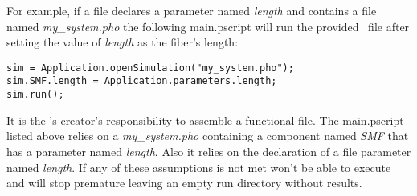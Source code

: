 For example, if a \PJOB{} file declares a parameter named \textit{length}
and contains a file named \textit{my\_system.pho}
the following main.pscript will run the provided \pho\ file
after setting the value of \textit{length} as the fiber's length:

\lstset{language=JavaScript}
\begin{lstlisting}
sim = Application.openSimulation("my_system.pho");
sim.SMF.length = Application.parameters.length;
sim.run();
\end{lstlisting}

It is the \PJOB{}'s creator's responsibility to assemble a functional \PJOB{} file.
The main.pscript listed above relies on a \textit{my\_system.pho} containing a component named \textit{SMF}
that has a parameter named \textit{length}.
Also it relies on the declaration of a \PJOB{} file parameter named \textit{length}.
If any of these assumptions is not met \PHO{} won't be able to execute and will stop premature
leaving an empty run directory without results.




